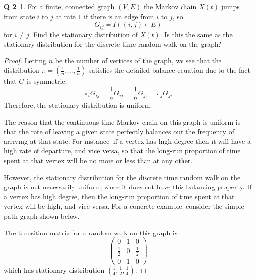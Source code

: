 \documentclass[12pt]{article}
\theoremstyle{definition}
\newtheorem*{prob2}{Q 2}
\begin{document}
\begin{prob2}
For a finite, connected graph $(V,E)$ the Markov chain $X(t)$ jumps from state $i$ to $j$ at rate $1$ if there is an edge from $i$ to $j$, so
$$
G_{ij} = I((i,j) \in E)
$$
for $i \neq j$.  Find the stationary distribution of $X(t)$.  Is this the same as the stationary distribution for the discrete time random walk on the graph?
\end{prob2}

\begin{proof}
Letting $n$ be the number of vertices of the graph, we see that the distribution $\pi = \left(\frac1n , \dots , \frac1n \right)$ satisfies the detailed balance equation due to the fact that $G$ is symmetric:
$$\pi_i G_{ij} = \frac1n G_{ij} = \frac1n G_{ji} = \pi_j G_{ji}$$
Therefore, the stationary distribution is uniform.

The reason that the continuous time Markov chain on this graph is uniform is that the rate of leaving a given state perfectly balances out the frequency of arriving at that state.  For instance, if a vertex has high degree then it will have a high rate of departure, and vice versa, so that the long-run proportion of time spent at that vertex will be no more or less than at any other.

However, the stationary distribution for the discrete time random walk on the graph is not necessarily uniform, since it does not have this balancing property.  If a vertex has high degree, then the long-run proportion of time spent at that vertex will be high, and vice-versa.  For a concrete example, consider the simple path graph shown below.

\begin{figure}[h!]
\begin{center}
\end{center}
\end{figure}
\noindent The transition matrix for a random walk on this graph is
$$
\begin{pmatrix}
0 & 1 & 0 \\
\frac12 & 0 & \frac12 \\
0 & 1 & 0
\end{pmatrix}
$$
which has stationary distribution $\left( \frac14 , \frac12 , \frac14 \right)$.
\end{proof}
\end{document}
